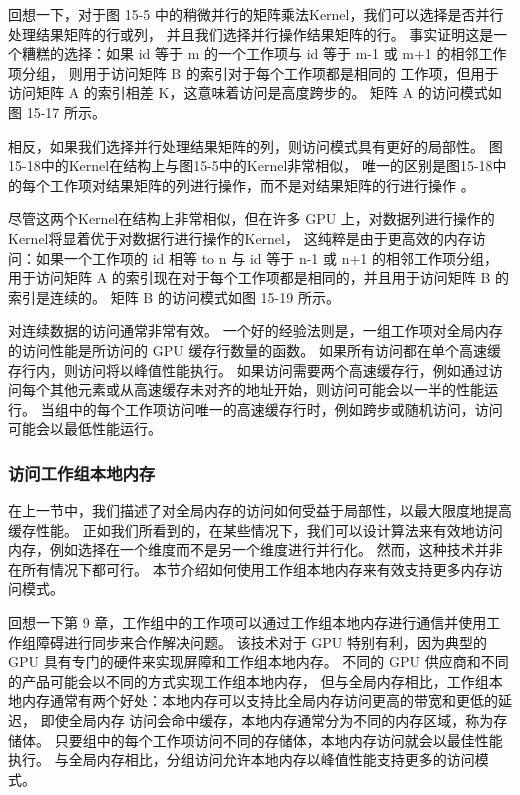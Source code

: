 回想一下，对于图 15-5 中的稍微并行的矩阵乘法Kernel，我们可以选择是否并行处理结果矩阵的行或列，
并且我们选择并行操作结果矩阵的行。 
事实证明这是一个糟糕的选择：如果 id 等于 m 的一个工作项与 id 等于 m-1 或 m+1 的相邻工作项分组，
则用于访问矩阵 B 的索引对于每个工作项都是相同的 工作项，但用于访问矩阵 A 的索引相差 K，这意味着访问是高度跨步的。 
矩阵 A 的访问模式如图 15-17 所示。

相反，如果我们选择并行处理结果矩阵的列，则访问模式具有更好的局部性。 
图15-18中的Kernel在结构上与图15-5中的Kernel非常相似，
唯一的区别是图15-18中的每个工作项对结果矩阵的列进行操作，而不是对结果矩阵的行进行操作 。

尽管这两个Kernel在结构上非常相似，但在许多 GPU 上，对数据列进行操作的Kernel将显着优于对数据行进行操作的Kernel，
这纯粹是由于更高效的内存访问：如果一个工作项的 id 相等 to n 与 id 等于 n-1 或 n+1 的相邻工作项分组，
用于访问矩阵 A 的索引现在对于每个工作项都是相同的，并且用于访问矩阵 B 的索引是连续的。 
矩阵 B 的访问模式如图 15-19 所示。

对连续数据的访问通常非常有效。 一个好的经验法则是，一组工作项对全局内存的访问性能是所访问的 GPU 缓存行数量的函数。 
如果所有访问都在单个高速缓存行内，则访问将以峰值性能执行。 
如果访问需要两个高速缓存行，例如通过访问每个其他元素或从高速缓存未对齐的地址开始，则访问可能会以一半的性能运行。 
当组中的每个工作项访问唯一的高速缓存行时，例如跨步或随机访问，访问可能会以最低性能运行。

\subsubsection{访问工作组本地内存}
在上一节中，我们描述了对全局内存的访问如何受益于局部性，以最大限度地提高缓存性能。 
正如我们所看到的，在某些情况下，我们可以设计算法来有效地访问内存，例如选择在一个维度而不是另一个维度进行并行化。 
然而，这种技术并非在所有情况下都可行。 本节介绍如何使用工作组本地内存来有效支持更多内存访问模式。

回想一下第 9 章，工作组中的工作项可以通过工作组本地内存进行通信并使用工作组障碍进行同步来合作解决问题。 
该技术对于 GPU 特别有利，因为典型的 GPU 具有专门的硬件来实现屏障和工作组本地内存。 
不同的 GPU 供应商和不同的产品可能会以不同的方式实现工作组本地内存，
但与全局内存相比，工作组本地内存通常有两个好处：本地内存可以支持比全局内存访问更高的带宽和更低的延迟，
即使全局内存 访问会命中缓存，本地内存通常分为不同的内存区域，称为存储体。 
只要组中的每个工作项访问不同的存储体，本地内存访问就会以最佳性能执行。 
与全局内存相比，分组访问允许本地内存以峰值性能支持更多的访问模式。

